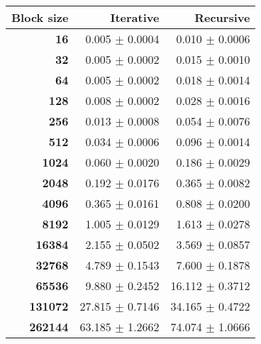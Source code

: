 \begin{tabular}{rrr}\toprule
\textbf{Block size}  & \textbf{Iterative} & \textbf{Recursive}\\\midrule
\textbf{16}  & 0.005 $\pm$ 0.0004 & 0.010 $\pm$ 0.0006\\
\textbf{32}  & 0.005 $\pm$ 0.0002 & 0.015 $\pm$ 0.0010\\
\textbf{64}  & 0.005 $\pm$ 0.0002 & 0.018 $\pm$ 0.0014\\
\textbf{128}  & 0.008 $\pm$ 0.0002 & 0.028 $\pm$ 0.0016\\
\textbf{256}  & 0.013 $\pm$ 0.0008 & 0.054 $\pm$ 0.0076\\
\textbf{512}  & 0.034 $\pm$ 0.0006 & 0.096 $\pm$ 0.0014\\
\textbf{1024}  & 0.060 $\pm$ 0.0020 & 0.186 $\pm$ 0.0029\\
\textbf{2048}  & 0.192 $\pm$ 0.0176 & 0.365 $\pm$ 0.0082\\
\textbf{4096}  & 0.365 $\pm$ 0.0161 & 0.808 $\pm$ 0.0200\\
\textbf{8192}  & 1.005 $\pm$ 0.0129 & 1.613 $\pm$ 0.0278\\
\textbf{16384}  & 2.155 $\pm$ 0.0502 & 3.569 $\pm$ 0.0857\\
\textbf{32768}  & 4.789 $\pm$ 0.1543 & 7.600 $\pm$ 0.1878\\
\textbf{65536}  & 9.880 $\pm$ 0.2452 & 16.112 $\pm$ 0.3712\\
\textbf{131072}  & 27.815 $\pm$ 0.7146 & 34.165 $\pm$ 0.4722\\
\textbf{262144} & 63.185 $\pm$ 1.2662 & 74.074 $\pm$ 1.0666\\
\bottomrule
\end{tabular}
